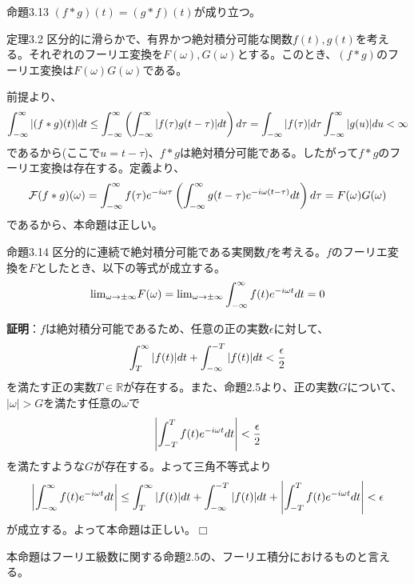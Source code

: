 \documentclass[dvipdfmx, 9pt, a4paper]{jsarticle}
\def\qed{\hfill $\Box$}
\begin{document}
\begin{itembox}[l]{命題3.13}
$(f*g)(t)=(g*f)(t)$が成り立つ。
\end{itembox}
\begin{itembox}[l]{定理3.2}
区分的に滑らかで、有界かつ絶対積分可能な関数$f(t), g(t)$を考える。それぞれのフーリエ変換を$F(\omega), G(\omega)$とする。このとき、$(f*g)$のフーリエ変換は$F(\omega)G(\omega)$である。
\end{itembox}
前提より、
\begin{equation}
\int_{-\infty}^\infty |(f*g)(t)|dt \leq \int_{-\infty}^\infty \left(\int_{-\infty}^\infty |f(\tau)g(t-\tau)|dt \right)d\tau = \int_{-\infty}|f(\tau)|d\tau \int_{-\infty}^\infty |g(u)|du < \infty \notag
\end{equation}
であるから(ここで$u=t-\tau$)、$f*g$は絶対積分可能である。したがって$f*g$のフーリエ変換は存在する。定義より、
\begin{equation}
\mathcal{F}(f*g)(\omega)=\int_{-\infty}^\infty f(\tau)e^{-i\omega \tau}\left( \int_{-\infty}^\infty g(t-\tau)e^{-i\omega(t-\tau)}dt \right) d\tau=F(\omega)G(\omega) \notag
\end{equation}
であるから、本命題は正しい。

\begin{itembox}[l]{命題3.14}
区分的に連続で絶対積分可能である実関数$f$を考える。$f$のフーリエ変換を$F$としたとき、以下の等式が成立する。
\begin{equation}
{\rm lim}_{\omega \to \pm \infty} F(\omega)={\rm lim}_{\omega \to \pm \infty}\int_{-\infty}^\infty f(t)e^{-i\omega t}dt=0 \notag
\end{equation}
\end{itembox}
{\bf 証明}：$f$は絶対積分可能であるため、任意の正の実数$\epsilon$に対して、
\begin{equation}
\int_{T}^\infty |f(t)|dt + \int_{-\infty}^{-T}|f(t)|dt<\frac{\epsilon}{2} \notag
\end{equation}
を満たす正の実数$T \in \mathbb{R}$が存在する。また、命題2.5より、正の実数$G$について、$|\omega|>G$を満たす任意の$\omega$で
\begin{equation}
\left|\int_{-T}^T f(t)e^{-i\omega t} dt\right|<\frac{\epsilon}{2} \notag
\end{equation}
を満たすような$G$が存在する。よって三角不等式より
\begin{equation}
\left| \int_{-\infty}^\infty f(t)e^{-i\omega t}dt \right| \leq \int_{T}^\infty |f(t)|dt + \int_{-\infty}^{-T}|f(t)|dt + \left|\int_{-T}^T f(t)e^{-i\omega t} dt\right| < \epsilon \notag
\end{equation}
が成立する。よって本命題は正しい。\qed \par
本命題はフーリエ級数に関する命題2.5の、フーリエ積分におけるものと言える。
\end{document}
